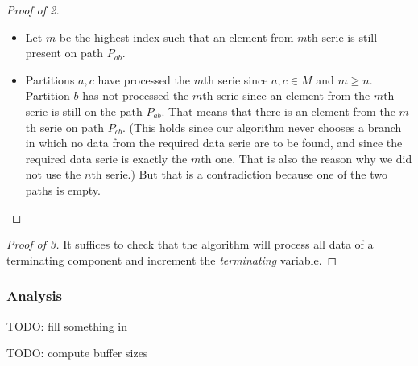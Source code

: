 \begin{claim}
\begin{proof}[Proof of 2]
\begin{itemize}
    \item Let $m$ be the highest index such that an element from $m$th serie is still present on path $P_{ab}$. 

    \item Partitions $a,c$ have processed the $m$th serie since $a,c \in M$ and $m \geq n$. Partition $b$ has not processed the $m$th serie since an element from the $m$th serie is still on the path $P_{ab}$. That means that there is an element from the $m$th serie on path $P_{cb}$. (This holds since our algorithm never chooses a branch in which no data from the required data serie are to be found, and since the required data serie is exactly the $m$th one. That is also the reason why we did not use the $n$th serie.) But that is a contradiction because one of the two paths is empty.

  \end{itemize}

\end{proof}
\begin{proof}[Proof of 3]
It suffices to check that the algorithm will process all data of a terminating component and increment the \emph{terminating} variable.
\end{proof}
\end{claim}

\subsubsection{Analysis}
 
TODO: fill something in

TODO: compute buffer sizes


